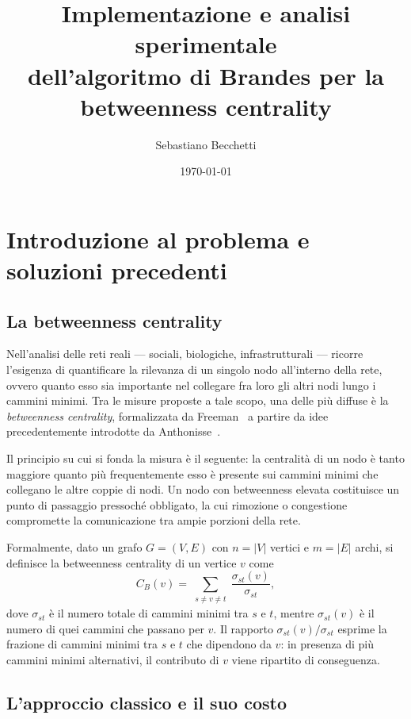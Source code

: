 \documentclass[11pt,a4paper]{report}
\title{\textbf{Implementazione e analisi sperimentale\\
dell'algoritmo di Brandes per la\\
betweenness centrality}}
\author{Sebastiano Becchetti}
\date{\today}
\begin{document}
\maketitle
\tableofcontents


\chapter{Introduzione al problema e soluzioni precedenti}

\section{La betweenness centrality}

Nell'analisi delle reti reali --- sociali, biologiche, infrastrutturali --- ricorre
l'esigenza di quantificare la rilevanza di un singolo nodo all'interno della rete,
ovvero quanto esso sia importante nel collegare fra loro gli altri nodi lungo i
cammini minimi. Tra le misure proposte a tale scopo, una
delle più diffuse è la \emph{betweenness centrality}, formalizzata da
Freeman~\cite{freeman1977} a partire da idee precedentemente introdotte da
Anthonisse~\cite{anthonisse1971}.

Il principio su cui si fonda la misura è il seguente: la centralità di un nodo è
tanto maggiore quanto più frequentemente esso è presente sui cammini minimi che
collegano le altre coppie di nodi. Un nodo con betweenness elevata costituisce
un punto di passaggio pressoché obbligato, la cui rimozione o congestione
compromette la comunicazione tra ampie porzioni della rete.

Formalmente, dato un grafo $G=(V,E)$ con $n=|V|$ vertici e $m=|E|$ archi, si
definisce la betweenness centrality di un vertice $v$ come
\begin{equation}
	C_B(v) = \sum_{\substack{s\neq v\neq t}}
	\frac{\sigma_{st}(v)}{\sigma_{st}},
	\label{eq:betweenness}
\end{equation}
dove $\sigma_{st}$ è il numero totale di cammini minimi tra $s$ e $t$, mentre
$\sigma_{st}(v)$ è il numero di quei cammini che passano per $v$. Il rapporto
$\sigma_{st}(v)/\sigma_{st}$ esprime la frazione di cammini minimi tra $s$ e
$t$ che dipendono da $v$: in presenza di più cammini minimi alternativi, il
contributo di $v$ viene ripartito di conseguenza.

\section{L'approccio classico e il suo costo}
\end{document}
